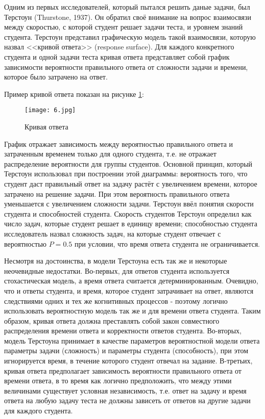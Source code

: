  Одним из первых исследователей, который пытался решить даные за\-дачи, был Терстоун (Thurstone, 1937\cite{34.}). Он обратил своё внимание на воп\-рос взаимосвязи между скоростью, с которой студент решает задачи теста, и уровнем знаний студента. Терстоун представил графическую модель такой взаимосвязи, которую назвал <<кривой ответа>> (response surface). Для каждого конкретного студента и одной задачи теста кривая ответа представляет собой график зависимости вероятности правиль\-ного ответа от сложности задачи и времени, которое было затрачено на ответ. 

\newpage
 Пример кривой ответа показан на рисунке \ref{respcurve}:

\begin{figure}[ht!] 
\centering \texttt{[image: 6.jpg]} 
\caption{Кривая ответа}
\label{respcurve}
\end{figure}

График отражает зависимость между вероятностью правильного ответа и затраченным временем только для одного студента, т.е. не отражает распре\-деление вероятности для группы студентов. Основной принцип, который Тер\-стоун использовал при построении этой диаграммы: вероятность того, что студент даст правильный ответ на задачу растёт с увеличением времени, которое затрачено на решение задачи. При этом вероятность правиль\-ного ответа уменьшается с увеличением сложности задачи. Терстоун ввёл понятия ско\-рости студента и способностей студента. Скорость студентов Терстоун опре\-делил как число задач, которые студент решает в единицу времени; способ\-ностью студента исследо\-ватель назвал сложность задач, на которые студент отвечает с вероятностью $P=0.5$ при условии, что время ответа студента не ограничи\-вается.

Несмотря на достоинства, в модели Терстоуна есть так же и некоторые неочевидные недостатки. Во-первых, для ответов студента используется сто\-хастическая модель, а время ответа считается детерминирован\-ным. Очевидно, что и ответы студента, и время, которое студент затрачивает на ответ, являют\-ся следствиями одних и тех же когнитивных процессов - поэтому логично исполь\-зовать вероятностную модель так же и для времени ответа студента. Таким образом, кривая ответа должна преставлять собой закон совместного распределения времени ответа и корректности ответов сту\-дента. Во-вторых, модель Терстоуна принимает в качестве параметров веро\-ятностной модели ответа парамет\-ры задачи (сложность) и параметры сту\-дента (способность), при этом игнорируется время, в течение которого студент отвечал на задание. В-третьих, кривая ответа предполагает зависимость вероятности правильно\-го ответа от времени ответа, в то время как логично предположить, что между этими величинами существует условная незави\-симость, т.е. ответ на задачу и время ответа на любую задачу теста не должны зависеть от ответов на другие задачи для каждого студента.

